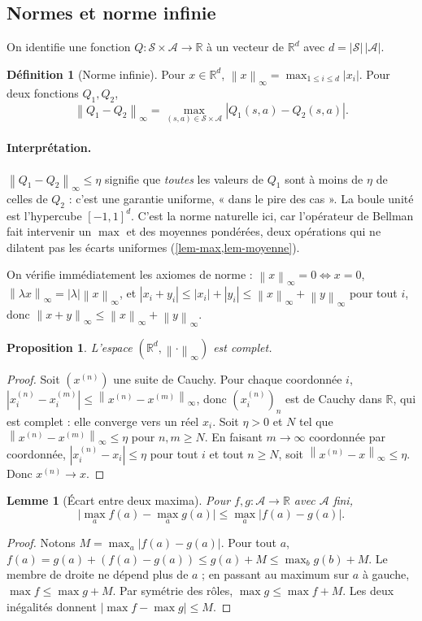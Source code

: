 \documentclass[11pt,a4paper]{article}
\theoremstyle{plain}
\newtheorem{proposition}[theoreme]{Proposition}
\newtheorem{lemme}[theoreme]{Lemme}
\theoremstyle{definition}
\newtheorem{definition}[theoreme]{Définition}
\theoremstyle{remark}
\newcommand{\R}{\mathbb{R}}
\newcommand{\cS}{\mathcal{S}}
\newcommand{\cA}{\mathcal{A}}
\newcommand{\ninf}[1]{\left\lVert #1 \right\rVert_\infty}
\newcommand{\abs}[1]{\left\lvert #1 \right\rvert}
\newcommand{\1}{\mathbf{1}}
\begin{document}
\subsection{Normes et norme infinie}

On identifie une fonction $Q:\cS\times\cA\to\R$ à un vecteur de $\R^{d}$ avec $d=|\cS|\,|\cA|$.

\begin{definition}[Norme infinie]
Pour $x\in\R^d$, $\ninf{x}=\max_{1\le i\le d}\abs{x_i}$. Pour deux fonctions $Q_1,Q_2$,
\[
\ninf{Q_1-Q_2}=\max_{(s,a)\in\cS\times\cA}\abs{Q_1(s,a)-Q_2(s,a)}.
\]
\end{definition}

\paragraph{Interprétation.} $\ninf{Q_1-Q_2}\le\eta$ signifie que \emph{toutes} les valeurs de $Q_1$ sont à moins de $\eta$ de celles de $Q_2$ : c'est une garantie uniforme, « dans le pire des cas ». La boule unité est l'hypercube $[-1,1]^d$. C'est la norme naturelle ici, car l'opérateur de Bellman fait intervenir un $\max$ et des moyennes pondérées, deux opérations qui ne dilatent pas les écarts uniformes (\cref{lem-max,lem-moyenne}).

On vérifie immédiatement les axiomes de norme : $\ninf{x}=0\iff x=0$, $\ninf{\lambda x}=\abs\lambda\ninf{x}$, et $\abs{x_i+y_i}\le\abs{x_i}+\abs{y_i}\le\ninf{x}+\ninf{y}$ pour tout $i$, donc $\ninf{x+y}\le\ninf{x}+\ninf{y}$.

\begin{proposition}\label{prop-complet}
L'espace $(\R^d,\ninf{\cdot})$ est complet.
\end{proposition}
\begin{proof}
Soit $(x^{(n)})$ une suite de Cauchy. Pour chaque coordonnée $i$, $\abs{x^{(n)}_i-x^{(m)}_i}\le\ninf{x^{(n)}-x^{(m)}}$, donc $(x^{(n)}_i)_n$ est de Cauchy dans $\R$, qui est complet : elle converge vers un réel $x_i$. Soit $\eta>0$ et $N$ tel que $\ninf{x^{(n)}-x^{(m)}}\le\eta$ pour $n,m\ge N$. En faisant $m\to\infty$ coordonnée par coordonnée, $\abs{x^{(n)}_i-x_i}\le\eta$ pour tout $i$ et tout $n\ge N$, soit $\ninf{x^{(n)}-x}\le\eta$. Donc $x^{(n)}\to x$.
\end{proof}

\begin{lemme}[Écart entre deux maxima]\label{lem-max}
Pour $f,g:\cA\to\R$ avec $\cA$ fini,
\[
\Big|\max_{a}f(a)-\max_{a}g(a)\Big|\le\max_{a}\abs{f(a)-g(a)}.
\]
\end{lemme}
\begin{proof}
Notons $M=\max_a\abs{f(a)-g(a)}$. Pour tout $a$, $f(a)=g(a)+(f(a)-g(a))\le g(a)+M\le\max_b g(b)+M$. Le membre de droite ne dépend plus de $a$ ; en passant au maximum sur $a$ à gauche, $\max f\le\max g+M$. Par symétrie des rôles, $\max g\le\max f+M$. Les deux inégalités donnent $\abs{\max f-\max g}\le M$.
\end{proof}
\end{document}
